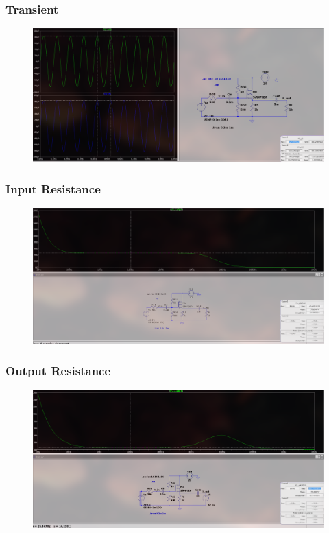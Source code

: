 \documentclass{article}
\begin{document}
\subsubsection{Transient}
\begin{figure}[h!]
        \centering
        \includegraphics[width=0.7\linewidth]{figs/mosfet_cd_tr.png}
    \end{figure}
    \pagebreak
\subsubsection{Input Resistance}
\begin{figure}[h!]
        \centering
        \includegraphics[width=0.7\linewidth]{figs/mosfet_cd_rin.png}
    \end{figure}
\subsubsection{Output Resistance}
\begin{figure}[h!]
        \centering
        \includegraphics[width=0.7\linewidth]{figs/mosfet_cd_rout.png}
    \end{figure}
\end{document}
